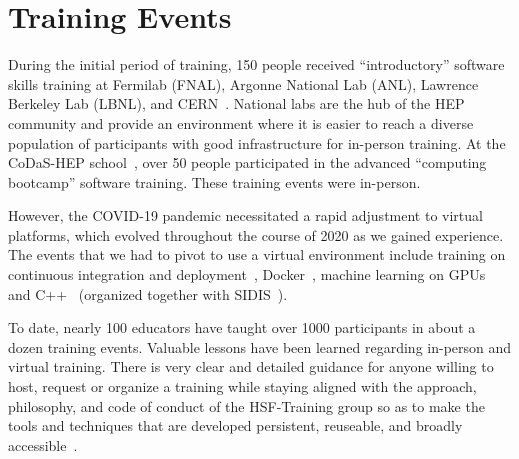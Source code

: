 \documentclass[twocolumn]{svjour3}          %
\begin{document}
\section{Training Events}\label{sec:Training}

During the initial period of training, 150 people received \enquote{introductory} software skills training at Fermilab (FNAL), Argonne National Lab (ANL), Lawrence Berkeley Lab (LBNL), and CERN~\cite{HSF-training-SC-FNAL-2019,HSF-training-ATLAS-ANL-2019,HSF-training-ATLAS-LBNL-2019,HSF-training-SC-CERN-2019}. National labs are the hub of the HEP community and provide an environment where it is easier to reach a diverse population of participants with good infrastructure for in-person training. At the CoDaS-HEP school~\cite{codas-hep}, over 50 people participated in the advanced \enquote{computing bootcamp} software training. These training events were in-person.

However, the COVID-19 pandemic necessitated a rapid adjustment to virtual platforms, which evolved throughout the course of 2020 as we gained experience. The events that we had to pivot to use a virtual environment include training on continuous integration and deployment~\cite{cicd_gitlab,cicd_github}, Docker~\cite{docker}, machine learning on GPUs \cite{mlgpu} and C++~\cite{cplusplus1} (organized together with SIDIS~\cite{sidis}).

To date, nearly 100 educators have taught over 1000 participants in about a dozen training events. Valuable lessons have been learned regarding in-person and virtual training. There is very clear and detailed guidance for anyone willing to host, request or organize a training while staying aligned with the approach, philosophy, and code of conduct of the HSF-Training group so as to make the tools and techniques that are developed persistent, reuseable, and broadly accessible~\cite{HSF-training-how-to}.
\end{document}
